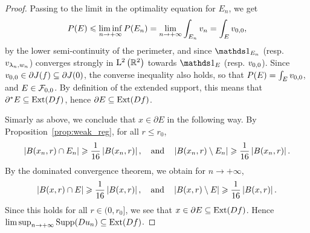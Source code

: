 \begin{proof}
Passing to the limit in the optimality equation for $E_n$, we get
\begin{equation}\label{lsc_perim}
  P(E)\leqslant \liminf_{n\to +\infty}P(E_n)=\lim_{n\to+\infty}\int_{E_n}v_{n} =\int_{E}v_{0,0},
\end{equation}
by the lower semi-continuity of the perimeter, and since $\bun{E_n}$ (resp. $v_{\lambda_n,w_n}$) converges strongly in $\mathrm{L}^2\left(\mathbb{R}^2\right)$ towards $\bun{E}$ (resp. $v_{0,0}$). Since $v_{0,0}\in \partial J(f)\subseteq \partial J(0)$, the converse inequality also holds, so that $P(E)=\int_Ev_{0,0}$,  and $E\in \mathcal{F}_{0,0}$. By definition of the extended support, this means that $\partial^*E\subseteq \operatorname{Ext}(Df)$, hence $\partial E\subseteq \operatorname{Ext}(Df)$.

Simarly as above, we conclude that $x\in\partial E$ in the following way. By Proposition~\ref{prop:weak_reg}, for all $r \leq r_0$,
\begin{equation}\label{eq:reg_conseq}
  \left| B(x_n,r)\cap E_{n} \right|\geqslant \frac{1}{16}\left| B(x_n,r) \right|,\quad \text{and} \quad \left| B(x_n,r)\setminus E_{n} \right| \geqslant \frac{1}{16}\left| B(x_n,r) \right|.
\end{equation}
By the dominated convergence theorem, we obtain for $n\to+\infty$,
\begin{equation*}
  \left| B(x,r)\cap E \right|\geqslant \frac{1}{16}\left| B(x,r) \right|,\quad \text{and} \quad \left| B(x,r)\setminus E \right| \geqslant \frac{1}{16}\left| B(x,r) \right|.
\end{equation*}
Since this holds for all $r\in (0,r_0]$, we see that $x\in \partial E\subseteq \operatorname{Ext}(Df)$. Hence $\limsup_{n\to+\infty} \operatorname{Supp}(Du_{n})\subseteq \operatorname{Ext}(Df)$.
\end{proof}



%
%
%
%
%
%
%
%
%



